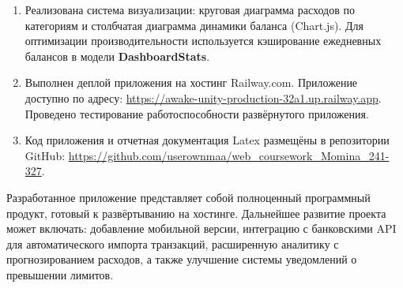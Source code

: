\begin{enumerate}
    \item Реализована система визуализации: круговая диаграмма расходов по категориям и столбчатая диаграмма динамики баланса (Chart.js). Для оптимизации производительности используется кэширование ежедневных балансов в модели \textbf{DashboardStats}.
    
    \item Выполнен деплой приложения на хостинг Railway.com. Приложение доступно по адресу: \url{https://awake-unity-production-32a1.up.railway.app}. Проведено тестирование работоспособности развёрнутого приложения.

    \item Код приложения и отчетная документация Latex размещёны в репозитории GitHub: \url{https://github.com/userownmaa/web_coursework_Momina_241-327}.
\end{enumerate}

Разработанное приложение представляет собой полноценный программный продукт, готовый к развёртыванию на хостинге. Дальнейшее развитие проекта может включать: добавление мобильной версии, интеграцию с банковскими API для автоматического импорта транзакций, расширенную аналитику с прогнозированием расходов, а также улучшение системы уведомлений о превышении лимитов.
